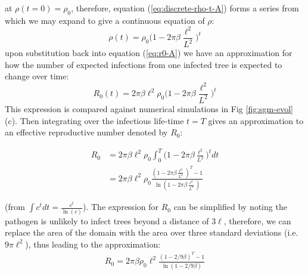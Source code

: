 at $\rho(t=0)=\rho_0$, therefore, equation (\ref{eq:discrete-rho-t-A}) forms a series from which we may expand to give a continuous equation of $\rho$:
\begin{equation}
    \rho(t) = \rho_0 \big(1 - 2\pi\beta\frac{\ell^2}{L^2}\big)^t
\end{equation}{}
upon substitution back into equation (\ref{eq:r0-A}) we have an approximation for how the number of expected infections from one infected tree is expected to change over time:
\begin{equation}
    R_0(t) = 2\pi\beta\ell^2\rho_0 \big(1 - 2\pi\beta\frac{\ell^2}{L^2} \big)^t
    \label{eq:Rt-A}
\end{equation}{}
This expression is compared against numerical simulations in Fig \ref{fig:sgm-evol}(c). Then integrating over the infectious life-time $t=T$ gives an approximation to an effective reproductive number denoted by $R_0$:

\begin{equation} \label{eq1}
\begin{split}
R_0 & = 2\pi\beta\ell^2\rho_0 \int ^T _0 \big(1 - 2\pi\beta\frac{\ell^2}{L^2} \big)^t dt \\
 & = 2\pi\beta\ell^2\rho_0 \frac{ (1 - 2\pi \beta\frac{\ell^2}{L^2})^T - 1}{\ln(1 - 2\pi\beta\frac{\ell^2}{L^2})}
\end{split}
\end{equation}

(from $\int c^t dt = \frac{c^t}{\ln(c)}$). The expression for $R_0$ can be simplified by noting the pathogen is unlikely to infect trees beyond a distance of $3\ell$, therefore, we can replace the area of the domain with the area over three standard deviations (i.e. $9\pi\ell^2$), thus leading to the approximation:
\begin{align*}
    R_0 = 2\pi\beta\rho_0\ell^2 \frac{(1 - 2/9\beta)^T - 1}{\ln(1-2/9\beta)}
\end{align*}

\newpage

